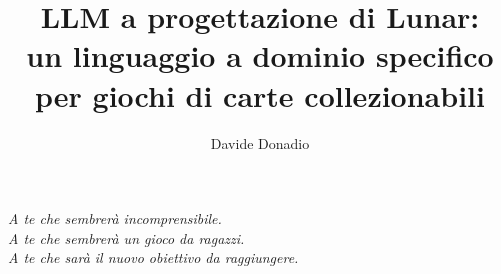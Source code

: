 \documentclass{theme/uniprthesis}
\title{LLM a progettazione di Lunar: \\ un linguaggio a dominio specifico \\ per giochi di carte collezionabili}
\author{Davide Donadio}
\begin{document}
\maketitle

\newpage
\thispagestyle{empty}
\null{}
\begin{flushright}
 	\textit{A te che sembrerà incomprensibile.} \\
	\textit{A te che sembrerà un gioco da ragazzi.} \\
  	\textit{A te che sarà il nuovo obiettivo da raggiungere.} \\
\end{flushright}
\null
\newpage

\pagestyle{plain}
\tableofcontents
%
\listoffigures    %
\listofalgorithms %
\listoftables     %
%
%
%

%
\pagestyle{fancy}






%
%
%
\pagestyle{plain}

%

\cleardoublepage
{}

%

%
\appendix

%
\end{document}
